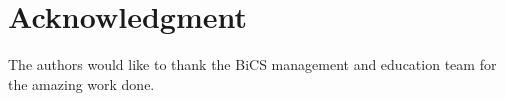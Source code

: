 {\color{gray}
\section*{Acknowledgment}
The authors would like to thank the BiCS management and education team for the amazing work done.
}
